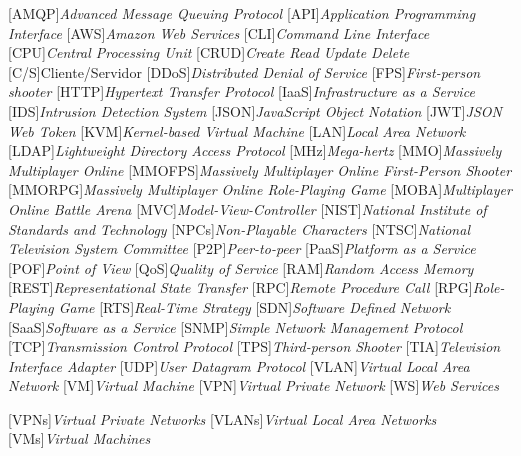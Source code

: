 \begin{acronym}[]
	[AMQP]{{\it Advanced Message Queuing Protocol}}
	[API]{{\it Application Programming Interface}}
  [AWS]{{\it Amazon Web Services}}
	[CLI]{{\it Command Line Interface}}
	[CPU]{{\it Central Processing Unit}}
	[CRUD]{{\it Create Read Update Delete}}
	[C/S]{{Cliente/Servidor}}
	[DDoS]{{\it Distributed Denial of Service}}
	[FPS]{{\it First-person shooter}}
	[HTTP]{{\it Hypertext Transfer Protocol}}
	[IaaS]{{\it Infrastructure as a Service}}
  [IDS]{{\it Intrusion Detection System}}
	[JSON]{{\it JavaScript Object Notation}}
	[JWT]{{\it JSON Web Token}}
	[KVM]{{\it Kernel-based Virtual Machine}}
	[LAN]{{\it Local Area Network}}
  [LDAP]{{\it Lightweight Directory Access Protocol}}
	[MHz]{{\it Mega-hertz}}
	[MMO]{{\it Massively Multiplayer Online}}
	[MMOFPS]{{\it Massively Multiplayer Online First-Person Shooter}}
	[MMORPG]{{\it Massively Multiplayer Online Role-Playing Game}}
	[MOBA]{{\it Multiplayer Online Battle Arena}}
	[MVC]{{\it Model-View-Controller}}
	[NIST]{{\it National Institute of Standards and Technology}}
	[NPCs]{{\it Non-Playable Characters}}
	[NTSC]{{\it National Television System Committee}}
	[P2P]{{\it Peer-to-peer}}
	[PaaS]{{\it Platform as a Service}}
	[POF]{{\it Point of View}}
	[QoS]{{\it Quality of Service}}
	[RAM]{{\it Random Access Memory}}
	[REST]{{\it Representational State Transfer}}
	[RPC]{{\it Remote Procedure Call}}
	[RPG]{{\it Role-Playing Game}}
	[RTS]{{\it Real-Time Strategy}}
	[SDN]{{\it Software Defined Network}}
	[SaaS]{{\it Software as a Service}}
	[SNMP]{{\it Simple Network Management Protocol}}
	[TCP]{{\it Transmission Control Protocol}}
	[TPS]{{\it Third-person Shooter}}
	[TIA]{{\it Television Interface Adapter}}
	[UDP]{{\it User Datagram Protocol}}
	[VLAN]{{\it Virtual Local Area Network}}
	[VM]{{\it Virtual Machine}}
	[VPN]{{\it Virtual Private Network}}
	[WS]{{\it Web Services}}



	[VPNs]{{\it Virtual Private Networks}}
	[VLANs]{{\it Virtual Local Area Networks}}
	[VMs]{{\it Virtual Machines}}
\end{acronym}

